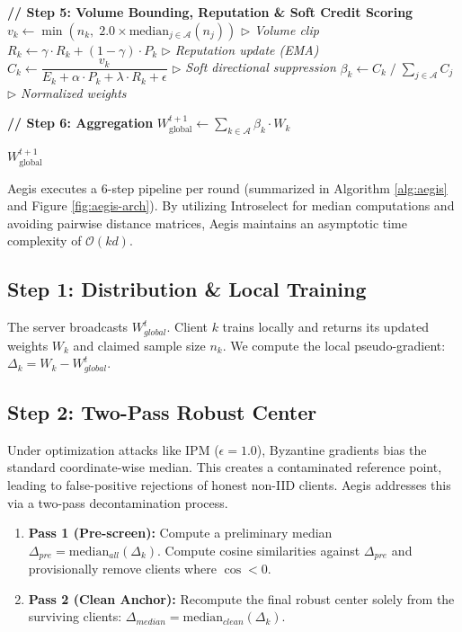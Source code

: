 \documentclass[10pt, conference]{IEEEtran}
\begin{document}
\begin{algorithm}[htbp]
\begin{algorithmic}[1]
\STATE

\STATE \textbf{// Step 5: Volume Bounding, Reputation \& Soft Credit Scoring}
    \STATE $v_k \leftarrow \min(n_k,\; 2.0 \times \text{median}_{j \in \mathcal{A}}(n_j))$ \hfill $\triangleright$ \textit{Volume clip}
    \STATE $R_k \leftarrow \gamma \cdot R_k + (1 - \gamma) \cdot P_k$ \hfill $\triangleright$ \textit{Reputation update (EMA)}
    \STATE $C_k \leftarrow \dfrac{v_k}{E_k + \alpha \cdot P_k + \lambda \cdot R_k + \epsilon}$ \hfill $\triangleright$ \textit{Soft directional suppression}
\ENDFOR
\STATE $\beta_k \leftarrow C_k \;/\; \sum_{j \in \mathcal{A}} C_j$ \hfill $\triangleright$ \textit{Normalized weights}

\STATE

\STATE \textbf{// Step 6: Aggregation}
\STATE $W^{t+1}_{\text{global}} \leftarrow \sum_{k \in \mathcal{A}} \beta_k \cdot W_k$

\RETURN $W^{t+1}_{\text{global}}$

\end{algorithmic}
\end{algorithm}

Aegis executes a 6-step pipeline per round (summarized in Algorithm \ref{alg:aegis} and Figure \ref{fig:aegis-arch}). By utilizing Introselect for median computations and avoiding pairwise distance matrices, Aegis maintains an asymptotic time complexity of $\mathcal{O}(kd)$.

\subsection{Step 1: Distribution \& Local Training}
The server broadcasts $W_{global}^t$. Client $k$ trains locally and returns its updated weights $W_k$ and claimed sample size $n_k$. We compute the local pseudo-gradient: $\Delta_k = W_k - W_{global}^t$.

\subsection{Step 2: Two-Pass Robust Center}
Under optimization attacks like IPM ($\epsilon=1.0$), Byzantine gradients bias the standard coordinate-wise median. This creates a contaminated reference point, leading to false-positive rejections of honest non-IID clients. Aegis addresses this via a two-pass decontamination process.
\begin{enumerate}
    \item \textbf{Pass 1 (Pre-screen):} Compute a preliminary median $\Delta_{pre} = \text{median}_{all}(\Delta_k)$. Compute cosine similarities against $\Delta_{pre}$ and provisionally remove clients where $\cos < 0$.
    \item \textbf{Pass 2 (Clean Anchor):} Recompute the final robust center solely from the surviving clients: $\Delta_{median} = \text{median}_{clean}(\Delta_k)$.
\end{enumerate}
\end{document}
